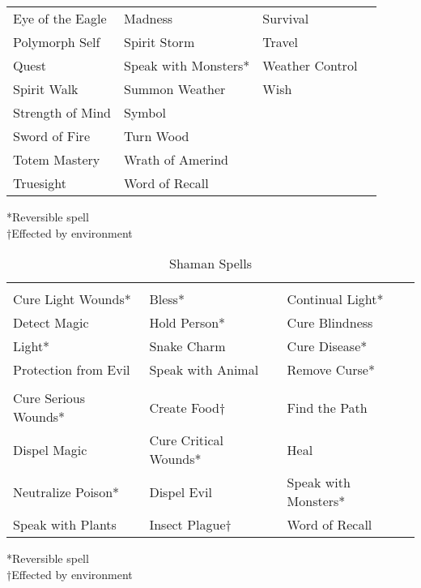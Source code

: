 \begin {table}[H]
\begin{tabularx}{\columnwidth}{YYYY}
	Eye of the Eagle & Madness & Survival\\
	Polymorph Self & Spirit Storm & Travel\\
	Quest & Speak with Monsters* & Weather Control\\
	Spirit Walk & Summon Weather & Wish\\
	Strength of Mind & Symbol &\\
	Sword of Fire & Turn Wood &\\
	Totem Mastery & Wrath of Amerind &\\
	Truesight & Word of Recall &\
	\end {tabularx}
	*Reversible spell\\
	†Effected by environment
\end {table}

\begin {table}[H]
  \caption{Shaman Spells}
  \begin{tabularx}{\columnwidth}{YYY}
	 &  & \\
	Cure Light Wounds* & Bless* & Continual Light*\\
	Detect Magic & Hold Person* & Cure Blindness\\
	Light* & Snake Charm & Cure Disease*\\
	Protection from Evil & Speak with Animal & Remove Curse*\\
	 &  & \\
	Cure Serious Wounds* & Create Food† & Find the Path\\
	Dispel Magic & Cure Critical Wounds* & Heal\\
	Neutralize Poison* & Dispel Evil & Speak with Monsters*\\
	Speak with Plants & Insect Plague† & Word of Recall\
	\end {tabularx}
	*Reversible spell\\
	†Effected by environment
\end {table}

